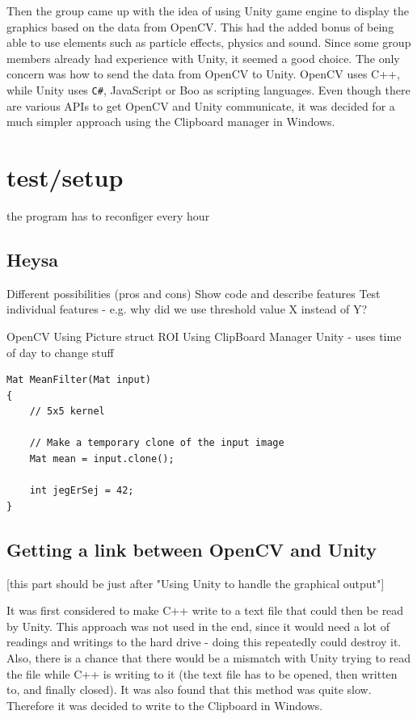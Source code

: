 Then the group came up with the idea of using Unity game engine to display the graphics based on the data from OpenCV. This had the added bonus of being able to use elements such as particle effects, physics and sound. Since some group members already had experience with Unity, it seemed a good choice. The only concern was how to send the data from OpenCV to Unity. OpenCV uses C++, while Unity uses \texttt{C\#}, JavaScript or Boo as scripting languages. Even though there are various APIs to get OpenCV and Unity communicate, it was decided for a much simpler approach using the Clipboard manager in Windows.

\section{test/setup}
the program has to reconfiger every hour

\subsection{Heysa}
Different possibilities (pros and cons)
Show code and describe features
Test individual features - e.g. why did we use threshold value X instead of Y?

OpenCV
Using Picture struct
ROI
Using ClipBoard Manager
Unity - uses time of day to change stuff

\begin{lstlisting}
Mat MeanFilter(Mat input)
{
	// 5x5 kernel

	// Make a temporary clone of the input image
	Mat mean = input.clone();

	int jegErSej = 42;
}
\end{lstlisting}

\subsection{Getting a link between OpenCV and Unity}
[this part should be just after "Using Unity to handle the graphical output"]

It was first considered to make C++ write to a text file that could then be read by Unity. This approach was not used in the end, since it would need a lot of readings and writings to the hard drive - doing this repeatedly could destroy it. Also, there is a chance that there would be a mismatch with Unity trying to read the file while C++ is writing to it (the text file has to be opened, then written to, and finally closed). It was also found that this method was quite slow. Therefore it was decided to write to the Clipboard in Windows.

